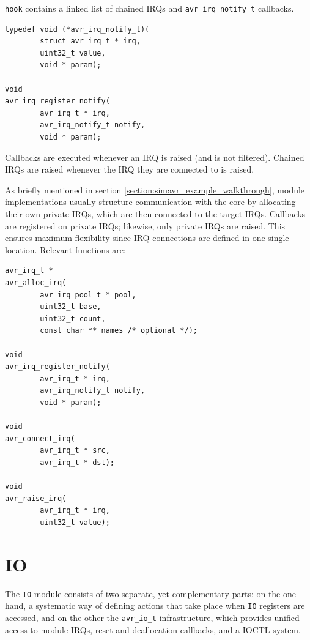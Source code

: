 \lstinline|hook| contains a linked list of chained \acp{IRQ} and
\lstinline|avr_irq_notify_t| callbacks.

\begin{lstlisting}
typedef void (*avr_irq_notify_t)(
        struct avr_irq_t * irq,
        uint32_t value,
        void * param);

void
avr_irq_register_notify(
        avr_irq_t * irq,
        avr_irq_notify_t notify,
        void * param);
\end{lstlisting}

Callbacks are executed whenever an \ac{IRQ} is raised (and is not filtered).
Chained \acp{IRQ} are raised whenever the \ac{IRQ} they are connected to is raised.

As briefly mentioned in section \ref{section:simavr_example_walkthrough}, module
implementations usually structure communication with the \simavr core by
allocating their own private \acp{IRQ}, which are then connected to the target
\simavr \acp{IRQ}. Callbacks are registered on private \acp{IRQ};
likewise, only private \acp{IRQ} are raised. This
ensures maximum flexibility since \ac{IRQ} connections are defined in one single
location. Relevant functions are:

\begin{lstlisting}
avr_irq_t *
avr_alloc_irq(
        avr_irq_pool_t * pool,
        uint32_t base,
        uint32_t count,
        const char ** names /* optional */);

void
avr_irq_register_notify(
        avr_irq_t * irq,
        avr_irq_notify_t notify,
        void * param);

void
avr_connect_irq(
        avr_irq_t * src,
        avr_irq_t * dst);

void
avr_raise_irq(
        avr_irq_t * irq,
        uint32_t value);
\end{lstlisting}


\section{\acf{IO}}

The \lstinline|IO| module consists of two separate, yet complementary parts: on the one hand,
a systematic way of defining actions that take place when \lstinline|IO| registers
are accessed, and on the other the \lstinline|avr_io_t| infrastructure, which
provides unified access to module \acp{IRQ}, reset and deallocation callbacks,
and a \ac{IOCTL} system.

